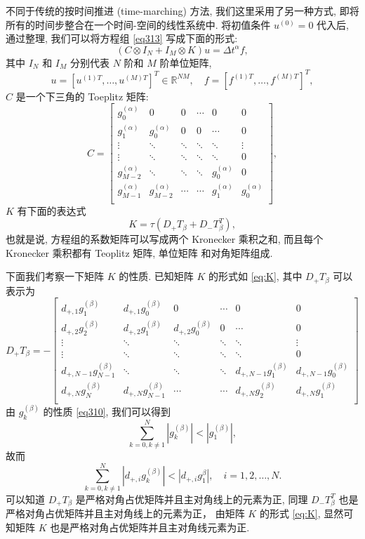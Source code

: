 \documentclass{ecnumaster}
\begin{document}
不同于传统的按时间推进 (time-marching) 方法,
我们这里采用了另一种方式, 即将所有的时间步整合在一个时间-空间的线性系统中.
将初值条件 $u^{(0)} = 0$ 代入后, 通过整理,
我们可以将方程组 \eqref{eq313} 写成下面的形式:
\begin{equation}\label{eq316}
(C \otimes I_N + I_M \otimes K)u = \Delta t^\alpha f,
\end{equation}
其中 $I_N$ 和  $I_M$ 分别代表 $N$ 阶和 $M$ 阶单位矩阵,
$$ u = [u^{(1)T}, \dots, u^{(M)T}]^T \in \mathbb{R}^{NM},
  \quad f = [f^{(1)T}, \dots, f^{(M)T}]^T,
$$
$C$ 是一个下三角的 Toeplitz 矩阵:
\begin{equation}\label{eq317}
C = \left[ \begin{matrix} g_0^{(\alpha)} & 0 & 0 & \cdots & 0 & 0 \\
g_1^{(\alpha)} & g_0^{(\alpha)} & 0 & 0 & \cdots &  0 \\
\vdots & \ddots & \ddots & \ddots & \ddots & \vdots\\
\vdots & \ddots & \ddots & \ddots & \ddots & 0\\
g_{M-2}^{(\alpha)}& \ddots & \ddots & \ddots & g_0^{(\alpha)} & 0\\
g_{M-1}^{(\alpha)}& g_{M-2}^{(\alpha)} & \cdots & \cdots & g_1^{(\alpha)} & g_0^{(\alpha)}\\
\end{matrix} \right],
\end{equation}
$K$ 有下面的表达式
\begin{equation}\label{eq:K}
  K = \tau(D_+ T_{\beta} + D_-T_{\beta}^T),
\end{equation}
也就是说, 方程组的系数矩阵可以写成两个 Kronecker 乘积之和,
而且每个 Kronecker 乘积都有 Teoplitz 矩阵, 单位矩阵 和对角矩阵组成.

下面我们考察一下矩阵 $K$ 的性质.
已知矩阵 $K$ 的形式如 \eqref{eq:K},
其中
$D_+ T_{\beta}$ 可以表示为
$$
D_+ T_{\beta} = -\left[ \begin{matrix} d_{+,1}g_1^{(\beta)} & d_{+,1}g_0^{(\beta)} & 0 & \cdots & 0 & 0 \\
d_{+,2}g_2^{(\beta)} & d_{+,2}g_1^{(\beta)} & d_{+,2}g_0^{(\beta)} & 0 & \cdots &  0 \\
\vdots & \ddots & \ddots & \ddots & \ddots & \vdots\\
\vdots & \ddots & \ddots & \ddots & \ddots & 0\\
d_{+,N-1}g_{N-1}^{(\beta)}& \ddots & \ddots & \ddots & d_{+,N-1}g_1^{(\beta)} & d_{+,N-1}g_0^{(\beta)}\\
d_{+,N}g_{N}^{(\beta)}& d_{+,N}g_{N-1}^{(\beta)} & \cdots & \cdots & d_{+,N}g_2^{(\beta)} & d_{+,N}g_1^{(\beta)}\\
\end{matrix} \right]
$$
由 $g_k^{(\beta)}$ 的性质 \eqref{eq310},
我们可以得到 
$$
\sum _{k=0, k\neq 1}^{N} | g_k^{(\beta)} | < | g_1^{(\beta)} |,
$$
故而
$$
\sum _{k=0, k\neq 1}^{N} | d_{+, i}g_k^{(\beta)} | < |d_{+, i}g_1^{\beta}|, \quad i = 1,2,\dots,N.
$$
可以知道 $D_+ T_{\beta}$ 是严格对角占优矩阵并且主对角线上的元素为正,
同理 $D_- T_{\beta}^T$ 也是严格对角占优矩阵并且主对角线上的元素为正，
由矩阵 $K$ 的形式 \eqref{eq:K}, 显然可知矩阵 $K$ 也是严格对角占优矩阵并且主对角线元素为正.
\end{document}
